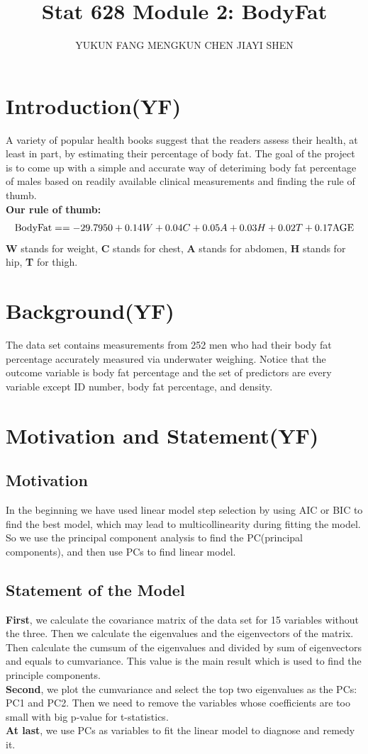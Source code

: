 \documentclass[12pt]{article}
\title{\vspace{-4em}Stat 628 Module 2: BodyFat}
\author{YUKUN FANG \quad MENGKUN CHEN \quad JIAYI SHEN}
\date{}
\begin{document}
\sffamily

\maketitle
\section{\sffamily Introduction(YF)}
A variety of popular health books suggest that the readers assess their 
health, at least in part, by estimating their percentage of body fat.
The goal of the project is to come up with 
a simple and accurate way of deteriming body fat percentage of males
based on readily available clinical measurements and finding the rule of thumb.\\
\textbf{Our rule of thumb:} $$ {\rm BodyFat} =  = -29.7950 + 0.14W + 0.04C + 0.05A+ 0.03H +0.02T + 0.17{\rm AGE}$$
\textbf{W} stands for weight, \textbf{C} stands for chest, \textbf{A} stands for abdomen, \textbf{H} stands for hip, \textbf{T} for thigh.
\section{\sffamily Background(YF)}
The data set contains measurements from 252 men who had their body fat 
percentage accurately measured via underwater weighing. Notice that the 
outcome variable is body fat percentage and the set of predictors are 
every variable except ID number, body fat percentage, and density.
\section{\sffamily Motivation and Statement(YF)}
\subsection{\sffamily Motivation}
In the beginning we have used linear model step selection by using 
AIC or BIC to find the best model, which may lead to multicollinearity during fitting the model.
So we use the principal component analysis to find the PC(principal components), and
then use PCs to find linear model.

\subsection{\sffamily Statement of the Model}
\textbf{First}, we calculate the covariance matrix of the data set for 15 variables without the three.
Then we calculate the eigenvalues and the eigenvectors of the matrix.
Then calculate the cumsum of the eigenvalues and divided by sum of eigenvectors and equals to cumvariance. 
This value is the main result which is used to find the principle components.\\
\textbf{Second}, we plot the cumvariance and select the top two eigenvalues as the PCs: PC1 and PC2.
Then we need to remove the variables whose coefficients are too small with big p-value for t-statistics.\\
\textbf{At last}, we use PCs as variables to fit the linear model to diagnose and remedy it.
\end{document}
